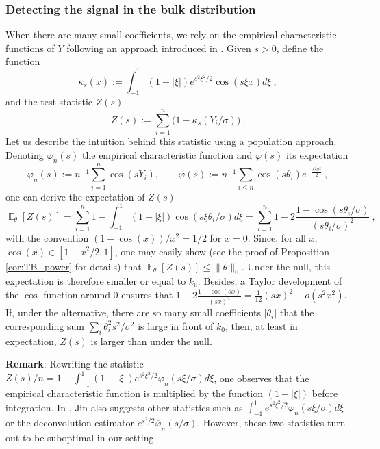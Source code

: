 \documentclass[twoside,11pt]{article}
\def\beq{\begin{equation}}
\def\eeq{\end{equation}}
\newcommand{\E}{\operatorname{\mathbb{E}}}
\newcommand{\<}{\langle}
\renewcommand{\>}{\rangle}
\begin{document}
 
 

\subsubsection{Detecting the signal in the bulk distribution}\label{sec:BulkKV}



When there are many small coefficients, we rely on the empirical characteristic functions of $Y$ following an approach introduced in \cite{MR2420411}. 
Given $s>0$, define the function
\beq \label{eq:defintion_kappa}
\kappa_{s}(x):= \int_{-1}^1 (1-|\xi|) e^{s^2\xi^2/2}\cos(s \xi x)d\xi\ ,
\eeq
and the test statistic $Z(s)$ 
\beq\label{eq:definition_Z}
Z(s) := \sum_{i=1}^n \big(1-  \kappa_{s}(Y_i/\sigma)\big)\ .
\eeq
Let us describe the intuition behind this statistic using a population approach. 
Denoting $\overline{\varphi}_n(s)$ the empirical characteristic function and $\overline{\varphi}(s)$ its expectation
\beq  \label{eq:definition_empirical_fourier}
\overline{\varphi}_n(s):= n^{-1}\sum_{i=1}^n \cos(s Y_i),\quad \quad \overline{\varphi}(s) := n^{-1}\sum_{i \leq n} \cos(s \theta_i) e^{-\frac{s^2\sigma^2}{2}}\ ,
\eeq
one can derive the expectation of $Z(s)$
\[\E_{\theta}[Z(s)]= \sum_{i=1}^n 1- \int_{-1}^1 (1-|\xi|)  \cos(s\xi\theta_i/\sigma)d\xi= \sum_{i=1}^n 1- 2\frac{1 - \cos(s\theta_i/\sigma)}{(s\theta_i/\sigma)^2} \ , \]
with the convention $(1-\cos(x))/x^2=1/2$ for $x=0$. Since, for all $x$, $\cos(x)\in [1-x^2/2,1]$, one may easily show (see the proof of Proposition \ref{cor:TB_power} for details) that $\E_{\theta}[Z(s)]\leq \|\theta\|_0$. Under the null, this expectation is therefore smaller or equal to $k_0$. Besides, a Taylor development of the $\cos$ function around $0$ ensures that $1- 2\frac{1 - \cos(sx)}{(sx)^2}= \frac{1}{12}(sx)^2+ o(s^2x^2)$. If, under the alternative, there are so many small coefficients $|\theta_i|$ that the corresponding sum 
$\sum_{i}\theta_i^2 s^2/\sigma^2$  is large in front of $k_0$, then, at least in expectation,  $Z(s)$ is larger than under the null. 

\medskip 


\noindent
{\bf Remark}: 
Rewriting the statistic $Z(s)/n=1- \int_{-1}^1(1-|\xi|)   e^{s^2\xi^2/2}\overline{\varphi}_n(s\xi/\sigma)d\xi $, one observes that the empirical characteristic function is multiplied by the function $(1-|\xi|)$ before integration. In   \cite{MR2420411}, Jin also suggests other statistics such as $\int_{-1}^1   e^{s^2\xi^2/2}\overline{\varphi}_n(s\xi/\sigma)d\xi$ or the deconvolution estimator $e^{s^2/2}\overline{\varphi}_n(s/\sigma)$. However, these two statistics turn out to be suboptimal in our setting. 
\end{document}

